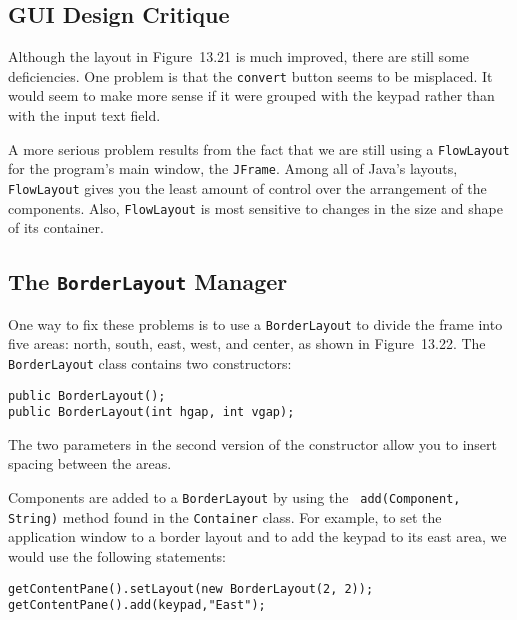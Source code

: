 \subsection{GUI Design Critique}
\noindent Although the layout in Figure~13.21 is much
improved, there are still some deficiencies.  One problem is
that the {\tt convert} button seems to be misplaced.   It would seem to
make more sense if it were grouped with the keypad rather
than with the input text field.

A more serious problem results from the fact that we are still using a
{\tt FlowLayout} for the program's main window, the
{\tt JFrame}. Among all of Java's layouts, {\tt FlowLayout} gives you the
least amount of control over the arrangement of the components.  Also,
{\tt FlowLayout} is most sensitive to changes in the size and shape of
its container.

\subsection{The {\tt BorderLayout} Manager}
\noindent One way to fix these problems is to use a {\tt BorderLayout} to divide
the frame into five areas: north, south, east, west, and center, as
shown in Figure~13.22. The {\tt BorderLayout} class contains two constructors:

\begin{jjjlisting}
\begin{lstlisting}
public BorderLayout();
public BorderLayout(int hgap, int vgap);
\end{lstlisting}
\end{jjjlisting}

\noindent The two parameters in the second version of the constructor
allow you to insert spacing between the areas.

Components are added to a {\tt BorderLayout} by using the {\tt
add(Com\-po\-nent, String)} method found in the {\tt Container} class.
For example, to set the application window to a border layout and to
add the keypad to its east area, we would use the following
statements:

\begin{jjjlisting}
\begin{lstlisting}
getContentPane().setLayout(new BorderLayout(2, 2));
getContentPane().add(keypad,"East");
\end{lstlisting}
\end{jjjlisting}

